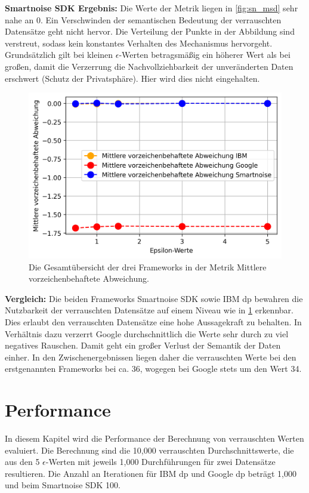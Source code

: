 \textbf{Smartnoise SDK Ergebnis:}
Die Werte der Metrik liegen in \cref{fig:sn_msd} sehr nahe an $0$. Ein Verschwinden der semantischen Bedeutung der verrauschten Datensätze geht nicht hervor. Die Verteilung der Punkte in der Abbildung sind verstreut, sodass kein konstantes Verhalten des Mechanismus hervorgeht. Grundsätzlich gilt bei kleinen $\epsilon$-Werten betragsmäßig ein höherer Wert als bei großen, damit die Verzerrung die Nachvollziehbarkeit der unveränderten Daten erschwert (Schutz der Privatsphäre). Hier wird dies nicht eingehalten.
\begin{figure}[htbp]
	\centering
	\includegraphics[scale=0.6]{./images/together_msd.png}
	\caption{Die Gesamtübersicht der drei Frameworks in der Metrik Mittlere vorzeichenbehaftete Abweichung.}
	\label{fig:together_msd}
\end{figure}

\textbf{Vergleich: }
Die beiden Frameworks Smartnoise SDK sowie IBM \gls{dp} bewahren die Nutzbarkeit der verrauschten Datensätze auf einem Niveau wie in \cref{fig:together_msd} erkennbar. Dies erlaubt den verrauschten Datensätze eine hohe Aussagekraft zu behalten. In Verhältnis dazu verzerrt Google durchschnittlich die Werte sehr durch zu viel negatives Rauschen. Damit geht ein großer Verlust der Semantik der Daten einher. In den Zwischenergebnissen liegen daher die verrauschten Werte bei den erstgenannten Frameworks bei ca. 36, wogegen bei Google stets um den Wert 34.
\newpage
\section{Performance}
In diesem Kapitel wird die Performance der Berechnung von verrauschten Werten evaluiert. Die Berechnung sind die 10,000 verrauschten Durchschnittswerte, die aus den 5 $\epsilon$-Werten mit jeweils 1,000 Durchführungen für zwei Datensätze resultieren. Die Anzahl an Iterationen für IBM \gls{dp} und Google \gls{dp} beträgt 1,000 und beim Smartnoise SDK 100.

